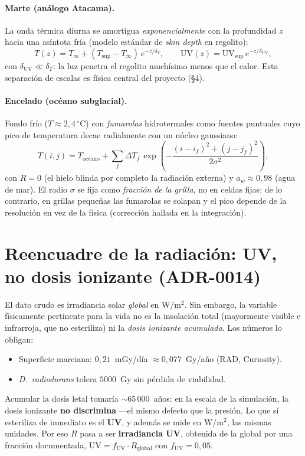 \documentclass[11pt]{article}
\begin{document}
\paragraph{Marte (análogo Atacama).} La onda térmica diurna se amortigua
\emph{exponencialmente} con la profundidad $z$ hacia una asíntota fría (modelo
estándar de \emph{skin depth} en regolito):
\begin{equation}
T(z)=T_{\infty}+(T_{\mathrm{sup}}-T_{\infty})\,e^{-z/\delta_T},\qquad
\mathrm{UV}(z)=\mathrm{UV}_{\mathrm{sup}}\,e^{-z/\delta_{\mathrm{UV}}},
\end{equation}
con $\delta_{\mathrm{UV}}\ll\delta_T$: la luz penetra el regolito muchísimo menos
que el calor. Esta separación de escalas es física central del proyecto (§4).

\paragraph{Encelado (océano subglacial).} Fondo frío ($T\approx 2{,}4\,^\circ$C)
con \emph{fumarolas} hidrotermales como fuentes puntuales cuyo pico de temperatura
decae radialmente con un núcleo gaussiano:
\begin{equation}
T(i,j)=T_{\text{océano}}+\sum_{f}\Delta T_f\,
\exp\!\left(-\frac{(i-i_f)^2+(j-j_f)^2}{2\sigma^2}\right),
\end{equation}
con $R=0$ (el hielo blinda por completo la radiación externa) y $a_w\approx 0{,}98$
(agua de mar). El radio $\sigma$ se fija como \emph{fracción de la grilla}, no en
celdas fijas: de lo contrario, en grillas pequeñas las fumarolas se solapan y el
pico depende de la resolución en vez de la física (corrección hallada en la
integración).

\section{Reencuadre de la radiación: UV, no dosis ionizante (ADR-0014)}

El dato crudo es irradiancia solar \emph{global} en W/m$^2$. Sin embargo, la
variable físicamente pertinente para la vida no es la insolación total (mayormente
visible e infrarroja, que no esteriliza) ni la \emph{dosis ionizante acumulada}.
Los números lo obligan:
\begin{itemize}[nosep]
  \item Superficie marciana: $0{,}21$~mGy/día $\approx 0{,}077$~Gy/año (RAD,
  Curiosity).
  \item \emph{D.\ radiodurans} tolera $5000$~Gy sin pérdida de viabilidad.
\end{itemize}
Acumular la dosis letal tomaría $\sim\!65\,000$~años: en la escala de la
simulación, la dosis ionizante \textbf{no discrimina} —el mismo defecto que la
presión. Lo que sí esteriliza de inmediato es el \textbf{UV}, y además se mide en
W/m$^2$, las mismas unidades. Por eso $R$ pasa a ser \textbf{irradiancia UV},
obtenida de la global por una fracción documentada,
$\mathrm{UV}=f_{\mathrm{UV}}\cdot R_{\text{global}}$ con $f_{\mathrm{UV}}=0{,}05$.
\end{document}
